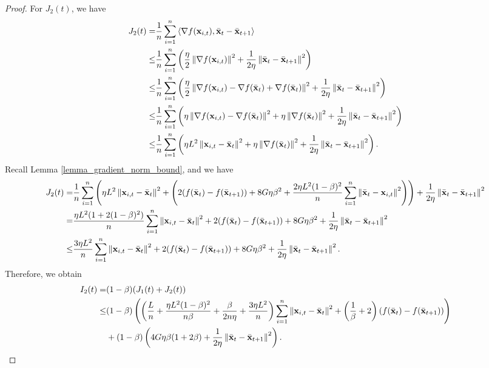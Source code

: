 \documentclass{article}
\begin{document}
\begin{proof}
For $J_2(t)$, we have
\begin{align}
\nonumber
J_2(t) = & \frac{1}{n}\sum_{i=1}^n\left\langle\nabla f({\bf x}_{i,t}), \bar{{\bf x}}_t - \bar{{\bf x}}_{t+1}  \right\rangle \\ \nonumber
\le & \frac{1}{n}\sum_{i=1}^n\left( \frac{\eta}{2}\left\lVert\nabla f({\bf x}_{i,t})\right\rVert^2 + \frac{1}{2\eta} \left\lVert \bar{{\bf x}}_t - \bar{{\bf x}}_{t+1}\right\rVert^2  \right) \\ \nonumber
\le & \frac{1}{n}\sum_{i=1}^n\left( \frac{\eta}{2}\left\lVert\nabla f({\bf x}_{i,t}) - \nabla f(\bar{{\bf x}}_t) + \nabla f(\bar{{\bf x}}_t)\right\rVert^2 + \frac{1}{2\eta} \left\lVert \bar{{\bf x}}_t - \bar{{\bf x}}_{t+1}\right\rVert^2  \right) \\ \nonumber
\le & \frac{1}{n}\sum_{i=1}^n\left(  \eta\left\lVert\nabla f({\bf x}_{i,t}) - \nabla f(\bar{{\bf x}}_t)\right\rVert^2 + \eta \left\lVert\nabla f(\bar{{\bf x}}_t)\right\rVert^2 + \frac{1}{2\eta} \left\lVert \bar{{\bf x}}_t - \bar{{\bf x}}_{t+1}\right\rVert^2  \right) \\ \nonumber
\le & \frac{1}{n}\sum_{i=1}^n\left(  \eta L^2 \left\lVert{\bf x}_{i,t} - \bar{{\bf x}}_t\right\rVert^2 + \eta \left\lVert\nabla f(\bar{{\bf x}}_t)\right\rVert^2 + \frac{1}{2\eta} \left\lVert \bar{{\bf x}}_t - \bar{{\bf x}}_{t+1}\right\rVert^2  \right).
\end{align} Recall Lemma \ref{lemma_gradient_norm_bound}, and we have
\begin{align}
\nonumber
J_2(t) = & \frac{1}{n}\sum_{i=1}^n\left(  \eta L^2 \left\lVert{\bf x}_{i,t} - \bar{{\bf x}}_t\right\rVert^2 + \left(  2(f(\bar{{\bf x}}_t) - f(\bar{{\bf x}}_{t+1})) + 8G\eta\beta^2 +  \frac{2\eta L^2(1-\beta)^2}{n}\sum_{i=1}^n\left\lVert\bar{{\bf x}}_t - {\bf x}_{i,t} \right\rVert^2  \right)  \right)  + \frac{1}{2\eta} \left\lVert \bar{{\bf x}}_t - \bar{{\bf x}}_{t+1}\right\rVert^2 \\ \nonumber
= & \frac{\eta L^2(1+2(1-\beta)^2)}{n}\sum_{i=1}^n \left\lVert{\bf x}_{i,t} - \bar{{\bf x}}_t\right\rVert^2 + 2(f(\bar{{\bf x}}_t) - f(\bar{{\bf x}}_{t+1})) + 8G\eta\beta^2 + \frac{1}{2\eta} \left\lVert \bar{{\bf x}}_t - \bar{{\bf x}}_{t+1}\right\rVert^2 \\ \nonumber
\le & \frac{3\eta L^2}{n}\sum_{i=1}^n \left\lVert{\bf x}_{i,t} - \bar{{\bf x}}_t\right\rVert^2 + 2(f(\bar{{\bf x}}_t) - f(\bar{{\bf x}}_{t+1})) + 8G\eta\beta^2 + \frac{1}{2\eta} \left\lVert \bar{{\bf x}}_t - \bar{{\bf x}}_{t+1}\right\rVert^2.
\end{align} Therefore, we obtain
\begin{align}
\nonumber
I_2(t) = & (1-\beta)(J_1(t) + J_2(t)) \\ \nonumber
\le & (1-\beta) \left(  \left(  \frac{L}{n} + \frac{\eta L^2(1-\beta)^2}{n\beta} + \frac{\beta}{2n\eta} + \frac{3\eta L^2}{n}  \right)\sum_{i=1}^n\left\lVert{\bf x}_{i,t} - \bar{{\bf x}}_t \right\rVert^2 + \left( \frac{1}{\beta} + 2 \right)\left( f(\bar{{\bf x}}_t) - f(\bar{{\bf x}}_{t+1}) \right)  \right)\\ \nonumber 
&+ (1-\beta) \left(  4G\eta\beta(1 + 2\beta) +  \frac{1}{2\eta} \left\lVert \bar{{\bf x}}_t - \bar{{\bf x}}_{t+1}\right\rVert^2  \right).
\end{align}






\end{proof}
\end{document}
